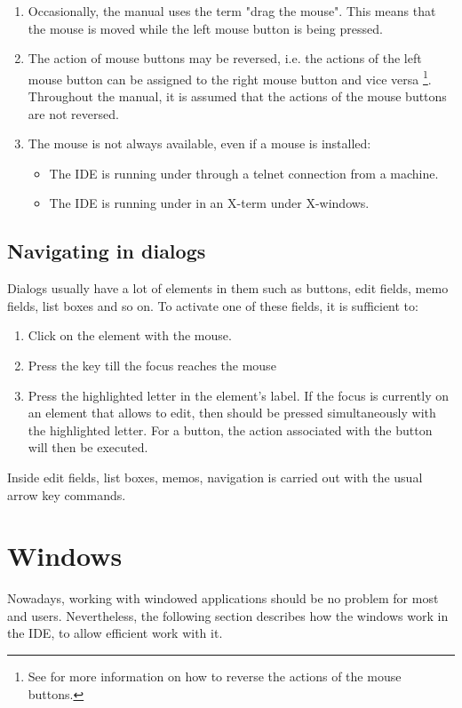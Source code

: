\begin{remark}
\begin{enumerate}
\item Occasionally, the manual uses the term "drag the mouse". This
means that the mouse is moved while the left mouse button is being 
pressed.
\item 
The action of mouse buttons may be reversed, i.e. the actions of the left
mouse button can be assigned to the right mouse button and vice versa  
\footnote{See  for more information on how to reverse the
actions of the mouse buttons.}. Throughout the manual, it is assumed 
that the actions of the mouse buttons are not reversed.
\item
The mouse is not always available, even if a mouse is installed:
\begin{itemize}
\item The IDE is running under \linux through a telnet connection from 
a \windows machine.
\item The IDE is running under \linux in an X-term under X-windows.
\end{itemize}
\end{enumerate}
\end{remark}
%
% 
\subsection{Navigating in dialogs}
\label{se:navigatingdialogs}
Dialogs usually have a lot of elements in them such as buttons, edit fields,
memo fields, list boxes and so on. To activate one of these fields, it is
sufficient to:
\begin{enumerate}
\item Click on the element with the mouse.
\item Press the  key till the focus reaches the mouse
\item Press the highlighted letter in the element's label. If the focus
is currently on an element that allows to edit, then  should be
pressed simultaneously with the highlighted letter. For a button, the action
associated with the button will then be executed.
\end{enumerate}
Inside edit fields, list boxes, memos, navigation is carried out with the
usual arrow key commands.

\section{Windows}
\label{se:windows}
Nowadays, working with windowed applications should be no problem for
most \windows and \linux users. Nevertheless, the following section 
describes how the windows work in the \fpc IDE, to allow efficient 
work with it.
%
%
